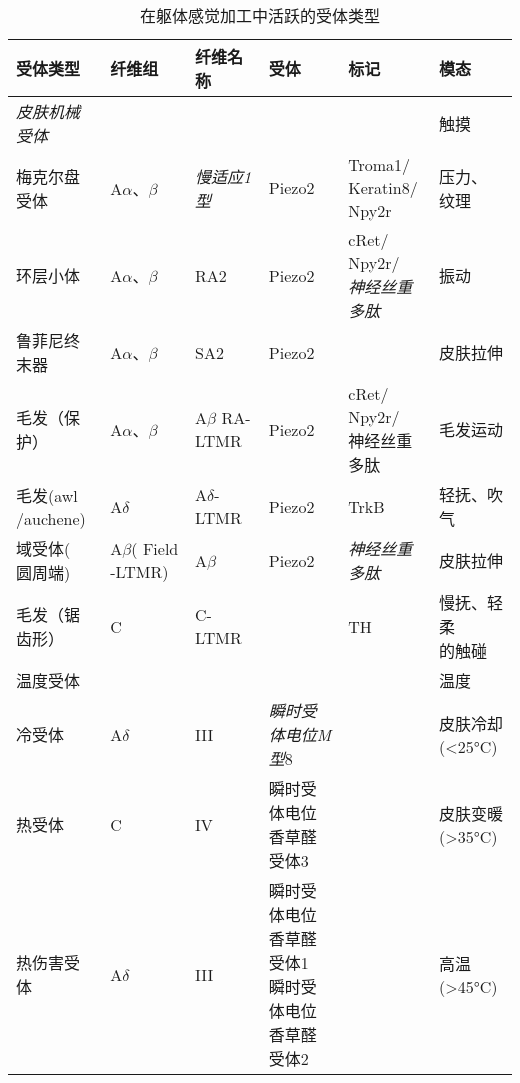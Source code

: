 \begin{table}[htbp]
	\caption{在躯体感觉加工中活跃的受体类型} \label{tab:18_2} \centering
	\begin{tabular}{llllll}
		\toprule
		受体类型 & 纤维组 & 纤维名称 & 受体 & 标记 & 模态\\
		\midrule
		\textit{皮肤机械受体} & &  &  &  & 触摸 \\
		梅克尔盘受体 & A$\alpha$、$\beta$ & \textit{慢适应1型} & Piezo2 & \makecell[l]{Troma1/\\Keratin8/\\Npy2r} & \makecell[l]{压力、\\纹理} \\
		环层小体 & A$\alpha$、$\beta$ & RA2 & Piezo2 & \makecell[l]{cRet/\\Npy2r/\\\textit{神经丝重多肽}} & 振动 \\
		鲁菲尼终末器 & A$\alpha$、$\beta$ & SA2 & Piezo2 &  & 皮肤拉伸 \\
		毛发（保护） & A$\alpha$、$\beta$ & A$\beta$ RA-LTMR & Piezo2 & \makecell[l]{cRet/\\Npy2r/\\神经丝重多肽} & 毛发运动 \\
		\makecell[l]{毛发(awl\\/auchene)} & A$\delta$ & \makecell[l]{A$\delta$-\\LTMR} & Piezo2 & TrkB & 轻抚、吹气 \\
		\makecell[l]{域受体(\\圆周端)} & \makecell[l]{A$\beta$(\\Field\\-LTMR)} & A$\beta$ & Piezo2 & \textit{神经丝重多肽} & 皮肤拉伸 \\
		毛发（锯齿形） & C & C-LTMR &  & TH & \makecell[l]{慢抚、轻柔\\的触碰} \\
		温度受体 &  &  &  &  & 温度 \\
		冷受体 & A$\delta$ & III & \textit{瞬时受体电位M型}8 &  & \makecell[l]{皮肤冷却\\(<25°C)} \\
		热受体 & C & IV & \makecell[l]{瞬时受体电位\\香草醛受体3} &  & \makecell[l]{皮肤变暖\\(>35°C)} \\
		热伤害受体 & A$\delta$ & III & \makecell[l]{瞬时受体电位\\香草醛受体1\\瞬时受体电位\\香草醛受体2} &  & 高温(>45°C) \\

\end{tabular}
\end{table}
